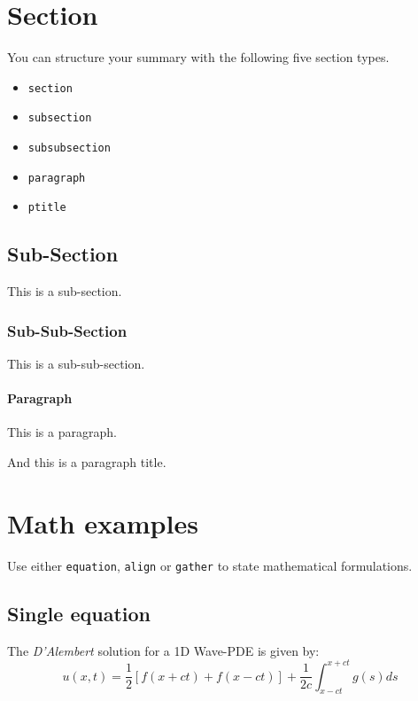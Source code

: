 \documentclass[\fontheight]{extarticle}
\begin{document}
\begin{multicols*}{3}



    \section{Section}
    You can structure your summary with the following five section types.
    \begin{itemize}
        \item \texttt{section}
        \item \texttt{subsection}
        \item \texttt{subsubsection}
        \item \texttt{paragraph}
        \item \texttt{ptitle}
    \end{itemize}

    \subsection{Sub-Section}
    This is a sub-section.

    \subsubsection{Sub-Sub-Section}
    This is a sub-sub-section.

    \paragraph{Paragraph}
    This is a paragraph.

    And this is a paragraph title.

    \section{Math examples}

    Use either \texttt{equation}, \texttt{align} or \texttt{gather} to
    state mathematical formulations.

    \subsection{Single equation}
    The \textit{D'Alembert} solution for a 1D Wave-PDE is given by:
    \begin{equation*}
        u(x,t)=\frac{1}{2}\left[f(x+ct)+f(x-ct)\right]+\frac{1}{2c}\int_{x-ct}^{x+ct}g(s)ds
    \end{equation*}


\end{multicols*}
\end{document}
